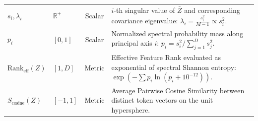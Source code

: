\documentclass{article}
\begin{document}
\begin{table}[ht]
{\begin{tabular}{llcp{8.6cm}}
$s_i, \lambda_i$ & $\mathbb{R}^+$ & Scalar & $i$-th singular value of $\bar{Z}$ and corresponding covariance eigenvalue: $\lambda_i = \frac{s_i^2}{M-1} \propto s_i^2$. \\
$p_i$ & $[0, 1]$ & Scalar & Normalized spectral probability mass along principal axis $i$: $p_i = s_i^2 / \sum_{j=1}^D s_j^2$. \\
$\text{Rank}_{\text{eff}}(Z)$ & $[1, D]$ & Metric & Effective Feature Rank evaluated as exponential of spectral Shannon entropy: $\exp(-\sum p_i \ln(p_i + 10^{-12}))$. \\
$S_{\text{cosine}}(Z)$ & $[-1, 1]$ & Metric & Average Pairwise Cosine Similarity between distinct token vectors on the unit hypersphere. \\
\bottomrule
\end{tabular}%
}
\end{table}
\end{document}
